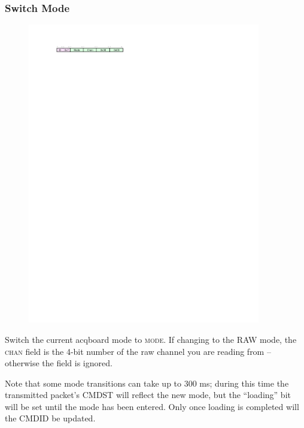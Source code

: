 \subsubsection{Switch Mode}
\begin{figure}[h!]
\includegraphics[width=4in]{switchmode.cmd.svg}
\end{figure}

Switch the current acqboard mode to \textsc{mode}. If changing to the RAW mode, the \textsc{chan} field is the 4-bit number of the raw channel you are reading from -- otherwise the field is ignored. 

Note that some mode transitions can take up to 300 ms; during this time the transmitted packet's CMDST will reflect the new mode, but the ``loading'' bit will be set until the mode has been entered. Only once loading is completed will the CMDID be updated. 

